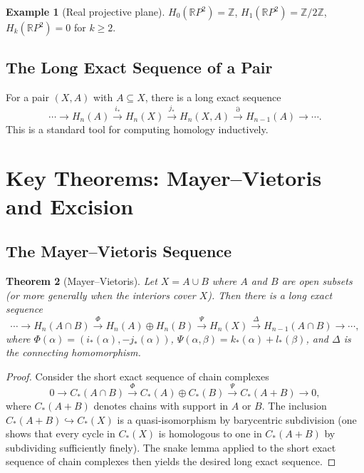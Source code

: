 \documentclass[12pt,a4paper]{amsart}
\newtheorem{theorem}{Theorem}[section]
\theoremstyle{definition}
\newtheorem{example}[theorem]{Example}
\begin{document}
\begin{example}[Real projective plane]
$H_0(\mathbb{R}P^2) = \mathbb{Z}$, $H_1(\mathbb{R}P^2) = \mathbb{Z}/2\mathbb{Z}$,
$H_k(\mathbb{R}P^2) = 0$ for $k \geq 2$.
\end{example}

\subsection{The Long Exact Sequence of a Pair}

For a pair $(X, A)$ with $A \subseteq X$, there is a long exact sequence
\[
  \cdots \to H_n(A) \xrightarrow{i_*} H_n(X)
  \xrightarrow{j_*} H_n(X, A)
  \xrightarrow{\partial} H_{n-1}(A) \to \cdots.
\]
This is a standard tool for computing homology inductively.

\section{Key Theorems: Mayer--Vietoris and Excision}
\label{sec:key}

\subsection{The Mayer--Vietoris Sequence}

\begin{theorem}[Mayer--Vietoris]
\label{thm:mayer_vietoris}
Let $X = A \cup B$ where $A$ and $B$ are open subsets (or more generally
when the interiors cover $X$). Then there is a long exact sequence
\[
  \cdots \to H_n(A \cap B)
  \xrightarrow{\Phi} H_n(A) \oplus H_n(B)
  \xrightarrow{\Psi} H_n(X)
  \xrightarrow{\Delta} H_{n-1}(A \cap B) \to \cdots,
\]
where $\Phi(\alpha) = (i_*(\alpha), -j_*(\alpha))$,
$\Psi(\alpha, \beta) = k_*(\alpha) + l_*(\beta)$,
and $\Delta$ is the connecting homomorphism.
\end{theorem}
\begin{proof}
Consider the short exact sequence of chain complexes
\[
  0 \to C_*(A \cap B) \xrightarrow{\Phi} C_*(A) \oplus C_*(B)
  \xrightarrow{\Psi} C_*(A+B) \to 0,
\]
where $C_*(A+B)$ denotes chains with support in $A$ or $B$.
The inclusion $C_*(A+B) \hookrightarrow C_*(X)$ is a quasi-isomorphism
by barycentric subdivision (one shows that every cycle in $C_*(X)$ is
homologous to one in $C_*(A+B)$ by subdividing sufficiently finely).
The snake lemma applied to the short exact sequence of chain complexes
then yields the desired long exact sequence.
\end{proof}
\end{document}
